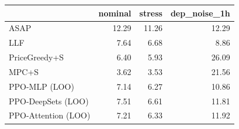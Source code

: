 \begin{tabular}{lrrr}
\toprule
 & nominal & stress & dep_noise_1h \\
\midrule
ASAP & 12.29 & 11.26 & 12.29 \\
LLF & 7.64 & 6.68 & 8.86 \\
PriceGreedy+S & 6.40 & 5.93 & 26.09 \\
MPC+S & 3.62 & 3.53 & 21.56 \\
PPO-MLP (LOO) & 7.14 & 6.27 & 10.86 \\
PPO-DeepSets (LOO) & 7.51 & 6.61 & 11.81 \\
PPO-Attention (LOO) & 7.21 & 6.33 & 11.92 \\
\bottomrule
\end{tabular}
